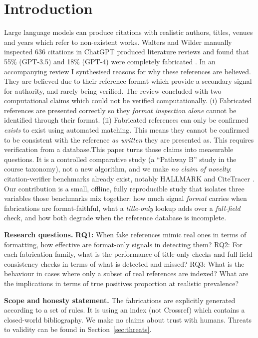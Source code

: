 \section{Introduction}
Large language models can produce citations with realistic authors, titles, venues and years which refer to non-existent works.
Walters and Wilder manually inspected 636 citations in ChatGPT produced literature reviews and found that 55\% (GPT-3.5)
and 18\% (GPT-4) were completely fabricated \cite{walters2023}. In an accompanying review I synthesised reasons for why
these references are believed. They are believed due to their reference format which provide a secondary signal for authority,
and rarely being verified. The review concluded with two computational claims which could not be verified computationally. (i)
Fabricated references are presented correctly so they \emph{format inspection alone} cannot be identified through their format. 
(ii) Fabricated references can only be confirmed \emph{exists} to exist using automated matching. This means they cannot be confirmed to be 
consistent with the reference \emph{as written} they are presented as. This requires verification from a database.This paper turns
those claims into measurable questions. It is a controlled comparative study (a ``Pathway B'' study in the course
taxonomy), not a new algorithm, and we make \emph{no claim of novelty}: citation-verifier benchmarks already exist, notably HALLMARK
\cite{reizinger2026} and CiteTracer \cite{li2026}. Our contribution is a small, offline, fully reproducible study that isolates three
variables those benchmarks mix together: how much signal \emph{format} carries when fabrications are format-faithful, what a
\emph{title-only} lookup adds over a \emph{full-field} check, and how both degrade when the reference database is incomplete.


\textbf{Research questions.}  \textbf{RQ1:} When fake references mimic real ones in terms of formatting, how effective
are format-only signals in detecting them? RQ2: For each fabrication family, what is the performance
of title-only checks and full-field consistency checks in terms of what is detected and missed?
RQ3: What is the behaviour in cases where only a subset of real references are indexed? What are
the implications in terms of true positives proportion at realistic prevalence?


\textbf{Scope and honesty statement.} The fabrications are explicitly generated according to a set of rules. 
It is using an index (not Crossref) which contains a closed-world bibliography. We make no claims about trust with humans. 
Threats to validity can be found in Section~\ref{sec:threats}.


